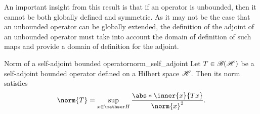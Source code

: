 An important insight from this result is that if an operator is unbounded, then it cannot be both globally defined and symmetric. As it may not be the case that an unbounded operator can be globally extended, the definition of the adjoint of an unbounded operator must take into account the domain of definition of such maps and provide a domain of definition for the adjoint.

\begin{theorem}{Norm of a self-adjoint bounded operator}{norm_self_adjoint}
    Let \(T \in \mathscr{B}(\mathscr{H})\) be a self-adjoint bounded operator defined on a Hilbert space \(\mathscr{H}\). Then its norm satisfies
    \begin{equation*}
        \norm{T} = \sup_{x \in \hilbert}\frac{\abs*{\inner{x}{Tx}}}{\norm{x}^2}.
    \end{equation*}
\end{theorem}
